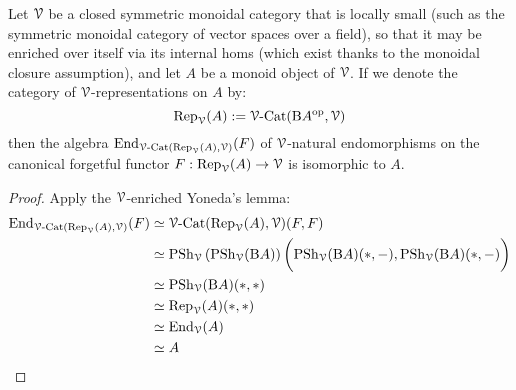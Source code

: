         \begin{lemma} \label{lemma: tannaka_duality}
            Let $\mathcal{V}$ be a closed symmetric monoidal category that is locally small (such as the symmetric monoidal category of vector spaces over a field), so that it may be enriched over itself via its internal homs (which exist thanks to the monoidal closure assumption), and let $A$ be a monoid object of $\mathcal{V}$. If we denote the category of $\mathcal{V}$-representations on $A$ by:
                $$\mathrm{Rep}_{\mathcal{V}}(A) := \mathcal{V}\text{-}\mathrm{Cat}(\mathrm{B} A^{\mathrm{op}}, \mathcal{V})$$
            then the algebra $\mathrm{End}_{\mathcal{V}\text{-}\mathrm{Cat}(\mathrm{Rep}_{\mathcal{V}}(A), \mathcal{V})}(F)$ of $\mathcal{V}$-natural endomorphisms on the canonical forgetful functor $F: \mathrm{Rep}_{\mathcal{V}}(A) \to \mathcal{V}$ is isomorphic to $A$.
        \end{lemma}
            \begin{proof}
                Apply the $\mathcal{V}$-enriched Yoneda's lemma:
                    $$
                        \begin{aligned}
                            \mathrm{End}_{\mathcal{V}\text{-}\mathrm{Cat}(\mathrm{Rep}_{\mathcal{V}}(A), \mathcal{V})}(F) & \simeq \mathcal{V}\text{-}\mathrm{Cat}(\mathrm{Rep}_{\mathcal{V}}(A), \mathcal{V})(F, F)
                            \\
                            & \simeq \mathrm{PSh}_{\mathcal{V}}\left(\mathrm{PSh}_{\mathcal{V}}(\mathrm{B} A)\right)\bigg(\mathrm{PSh}_{\mathcal{V}}(\mathrm{B} A)(*, -), \mathrm{PSh}_{\mathcal{V}}(\mathrm{B} A)(*, -)\bigg)
                            \\
                            & \simeq \mathrm{PSh}_{\mathcal{V}}(\mathrm{B} A)(*, *)
                            \\
                            & \simeq \mathrm{Rep}_{\mathcal{V}}(A)(*, *)
                            \\
                            & \simeq \mathrm{End}_{\mathcal{V}}(A)
                            \\
                            & \simeq A
                        \end{aligned}
                    $$
            \end{proof}
